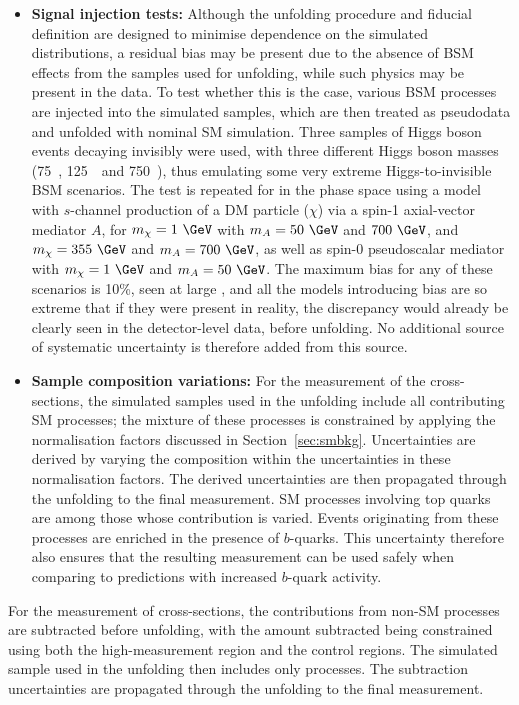 \documentclass[atlasdraft=false, cernpreprint, UKenglish, texmf, orcidlogo]{atlasdoc}
\begin{document}
\begin{itemize}
\item \textbf{Signal injection tests:} Although the unfolding procedure and fiducial definition are designed to minimise dependence on the simulated
distributions, a residual bias may be present due to the absence of BSM effects from the samples used for
unfolding, while such physics may be present in the data.
To test whether this is the case, various BSM processes are injected into the simulated samples, which are then treated as
pseudodata and unfolded with nominal SM simulation.
Three samples of Higgs boson events decaying invisibly were used, with three different Higgs boson masses (75~\GeV, 125~\GeV\ and 750~\GeV),
thus emulating some very extreme Higgs-to-invisible BSM scenarios.
The test is repeated for \ptmiss in the \onejet phase space using a model with
$s$-channel production of a DM particle ($\chi$) via a spin-1 axial-vector mediator $A$,
for $m_\chi = 1~\GeV$ with $m_A = 50~\GeV$ and $700~\GeV$,
and $m_\chi = 355~\GeV$ and $m_A = 700~\GeV$, as well as spin-0 pseudoscalar mediator with $m_\chi = 1~\GeV$ and $m_A = 50~\GeV$.
The maximum bias for any of these scenarios is 10\%, seen at large \ptmiss, and all the models introducing bias
are so extreme that if they were present in reality, the discrepancy
would already be clearly seen in the detector-level data, before unfolding. No additional source of systematic
uncertainty is therefore added from this source.
 
\item \textbf{Sample composition variations:} For the measurement of the \ptmiss cross-sections, the simulated samples used in the unfolding include
all contributing SM processes; the mixture of these processes is constrained by applying the normalisation factors discussed in Section~\ref{sec:smbkg}. Uncertainties are derived by varying the composition within the uncertainties in these normalisation factors. The derived uncertainties are then propagated through the unfolding to the final measurement.
SM processes involving top quarks are among those whose contribution is varied. Events originating from these processes are enriched in the presence of $b$-quarks. This uncertainty therefore also ensures that the resulting measurement can be used safely when comparing to predictions with increased $b$-quark activity.
\end{itemize}
 
For the measurement of \Znunu cross-sections, the contributions from non-\Znunu SM processes are
subtracted before unfolding, with the amount subtracted being constrained using
both the high-\ptmiss measurement region and the control regions. The simulated sample used in the unfolding then includes
only \Znunu processes. The subtraction uncertainties are propagated through the unfolding to the final measurement.
 
\end{document}
